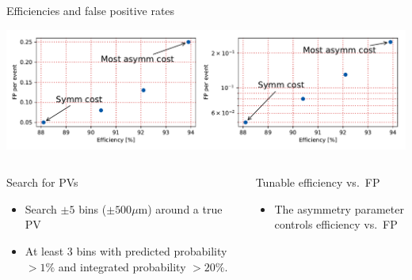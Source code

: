 \begin{frame}{Efficiencies and false positive rates}

\includegraphics[width=\textwidth]{images/EffVsFP2.pdf}

  \begin{columns}
  \begin{block}{Search for PVs}
    \begin{itemize}
    	\item Search $ \pm 5 $ bins ($ \pm 500 \mu $m) around a true PV
    	\item At least 3 bins with predicted probability
    	   $ > 1\% $ and
    	   integrated probability $ > 20\%$.
    \end{itemize}
    \end{block}

    \begin{block}{Tunable efficiency vs.\ FP}
    \begin{itemize}
        \item The asymmetry parameter controls efficiency vs.\ FP
    \end{itemize}
  \end{block}
\end{columns}
\end{frame}
